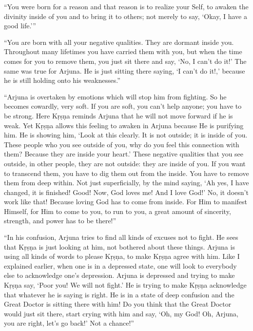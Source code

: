 \enquote{You were born for a reason and that reason is to realize your Self, to awaken the divinity inside of you and to bring it to others; not merely to say, \enquote{Okay, I have a good life.}}

\enquote{You are born with all your negative qualities. They are dormant inside you. Throughout many lifetimes you have carried them with you, but when the time comes for you to remove them, you just sit there and say, \enquote{No, I can’t do it!} The same was true for Arjuna. He is just sitting there saying, \enquote{I can’t do it!,} because he is still holding onto his weaknesses.}

\enquote{Arjuna is overtaken by emotions which will stop him from fighting. So he becomes cowardly, very soft. If you are soft, you can’t help anyone; you have to be strong. Here Kṛṣṇa reminds Arjuna that he will not move forward if he is weak. Yet Kṛṣṇa allows this feeling to awaken in Arjuna because He is purifying him. He is showing him, \enquote{Look at this clearly. It is not outside; it is inside of you. These people who you see outside of you, why do you feel this connection with them? Because they are inside your heart.} These negative qualities that you see outside, in other people, they are not outside: they are inside of you. If you want to transcend them, you have to dig them out from the inside. You have to remove them from deep within. Not just superficially, by the mind saying, \enquote{Ah yes, I have changed, it is finished! Good! Now, God loves me! And I love God!} No, it doesn’t work like that! Because loving God has to come from inside. For Him to manifest Himself, for Him to come to you, to run to you, a great amount of sincerity, strength, and power has to be there!}

\enquote{In his confusion, Arjuna tries to find all kinds of excuses not to fight. He sees that Kṛṣṇa is just looking at him, not bothered about these things. Arjuna is using all kinds of words to please Kṛṣṇa, to make Kṛṣṇa agree with him. Like I explained earlier, when one is in a depressed state, one will look to everybody else to acknowledge one’s depression. Arjuna is depressed and trying to make Kṛṣṇa say, \enquote{Poor you! We will not fight.} He is trying to make Kṛṣṇa acknowledge that whatever he is saying is right. He is in a state of deep confusion and the Great Doctor is sitting there with him! Do you think that the Great Doctor would just sit there, start crying with him and say, \enquote{Oh, my God! Oh, Arjuna, you are right, let’s go back!} Not a chance!}

